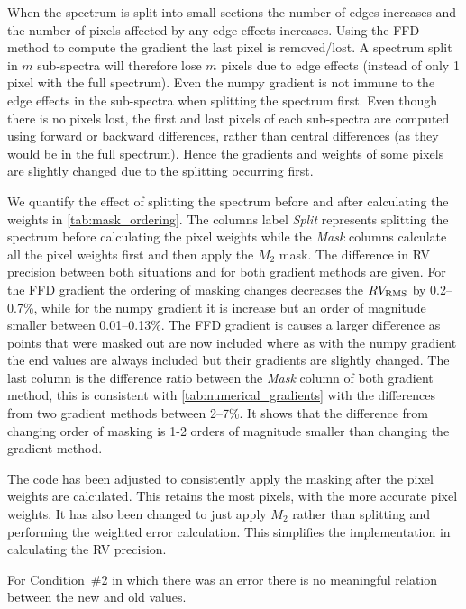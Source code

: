 When the spectrum is split into small sections the number of edges increases and the number of pixels affected by any edge effects increases.
Using the {FFD} method to compute the gradient the last pixel is removed/lost.
A spectrum split in \(m\) sub-spectra will therefore lose \(m\) pixels due to edge effects (instead of only 1 pixel with the full spectrum).
Even the numpy gradient is not immune to the edge effects in the sub-spectra when splitting the spectrum first.
Even though there is no pixels lost, the first and last pixels of each sub-spectra are computed using forward or backward differences, rather than central differences (as they would be in the full spectrum).
Hence the gradients and weights of some pixels are slightly changed due to the splitting occurring first.

We quantify the effect of splitting the spectrum before and after calculating the weights in \cref{tab:mask_ordering}.
The columns label \emph{Split} represents splitting the spectrum before calculating the pixel weights while the \emph{Mask} columns calculate all the pixel weights first and then apply the \(M_2\) mask.
The difference in {RV} precision between both situations and for both gradient methods are given.
For the {FFD} gradient the ordering of masking changes decreases the {\red{}\(RV_{\textrm{RMS}}\)} by 0.2--0.7\%, while for the numpy gradient it is increase but an order of magnitude smaller between 0.01--0.13\%.
The {FFD} gradient is causes a larger difference as points that were masked out are now included where as with the numpy gradient the end values are always included but their gradients are slightly changed.
The last column is the difference ratio between the \emph{Mask} column of both gradient method, this is consistent with \cref{tab:numerical_gradients} with the differences from two gradient methods between 2--7\%.
It shows that the difference from changing order of masking is 1-2 orders of magnitude smaller than changing the gradient method.

The code has been adjusted to consistently apply the masking after the pixel weights are calculated.
This retains the most pixels, with the more accurate pixel weights.
It has also been changed to just apply \(M_2\) rather than splitting and performing the weighted error calculation. This simplifies the implementation in calculating the {RV} precision.



{\red{} For Condition~\#2 in which there was an error there is no meaningful relation between the new and old values. }


